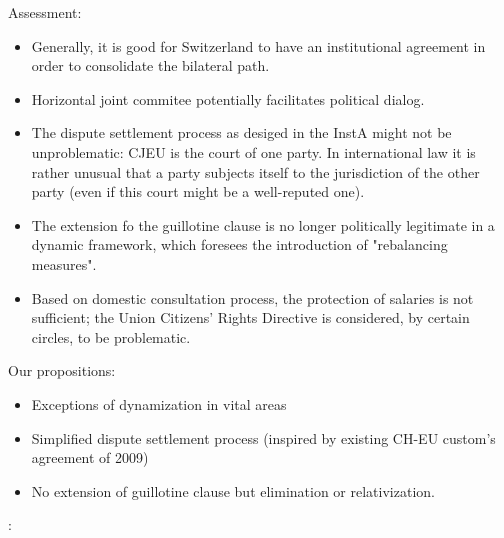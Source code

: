 Assessment:
\begin{itemize}
    \item Generally, it is good for Switzerland to have an institutional
        agreement in order to consolidate the bilateral path.
    \item Horizontal joint commitee potentially facilitates political dialog.
    \item The dispute settlement process as desiged in the InstA might not be
        unproblematic: CJEU is the court of one party. In international law it
        is rather unusual that a party subjects itself to the jurisdiction of
        the other party (even if this court might be a well-reputed one).
    \item The extension fo the guillotine clause is no longer politically
        legitimate in a dynamic framework, which foresees the introduction
        of "rebalancing measures".
    \item Based on domestic consultation process, the protection of salaries
        is not sufficient; the Union Citizens' Rights Directive is considered,
        by certain circles, to be problematic.
\end{itemize}

Our propositions:
\begin{itemize}
    \item Exceptions of dynamization in vital areas
    \item Simplified dispute settlement process (inspired by existing CH-EU
        custom's agreement of 2009)
    \item No extension of guillotine clause but elimination or relativization.
\end{itemize}

\vspace{1\baselineskip}

:

